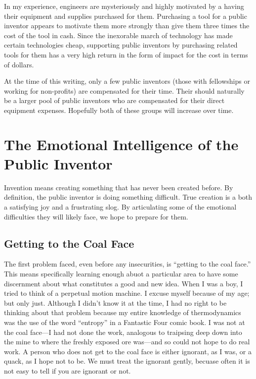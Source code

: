 \documentclass[
	fontsize=10pt, %
	twoside=false, %
	secnumdepth=1, %
]{kaobook}
\begin{document}
In my experience, engineers are mysteriously and highly motivated by a having their
equipment and supplies purchased for them.
Purchasing a tool for a public inventor appears to motivate them more strongly
than give them three times the cost of the tool in cash. Since
the inexorable march of technology has made certain technologies cheap,
supporting public inventors by purchasing related tools for them
has a very high return in the form of impact for the cost in terms of
dollars.

At the time of this writing, only a few public inventors (those
with fellowships or working for non-profits) are compensated for their
time. Their should naturally be a larger pool of public inventors who
are compensated for their direct equipment expenses. Hopefully
both of these groups will increase over time.

\chapter{The Emotional Intelligence of the Public Inventor}

Invention means creating something that has never been
created before.
By definition, the public inventor is doing something
difficult.
True creation is a both a satisfying
joy and a frustrating slog.
By articulating some of the emotional difficulties
they will likely face, we hope to prepare for them.

\section{Getting to the Coal Face}

The first problem faced, even before any insecurities,
is ``getting to the coal face.''
This means specifically learning enough abuot a particular
area to have some discernment about what constitutes a good and new idea.
When I was a boy, I tried to think of a perpetual motion machine.
I excuse myself because of my age; but only just.
Although I didn't know it at the time, I had no right to be
thinking about that problem because my entire knowledge of
thermodynamics was the use of the word ``entropy'' in a Fantastic Four comic book.
I was not at the coal face---I had not done the work, analogous to traipsing
deep down into the mine to where the freshly exposed ore was---and so could
not hope to do real work.
A person who does not get to the coal face is either ignorant,
as I was, or a quack, as I hope not to be.
We must treat the ignorant gently, becuase often it is not
easy to tell if you are ignorant or not.
\end{document}
